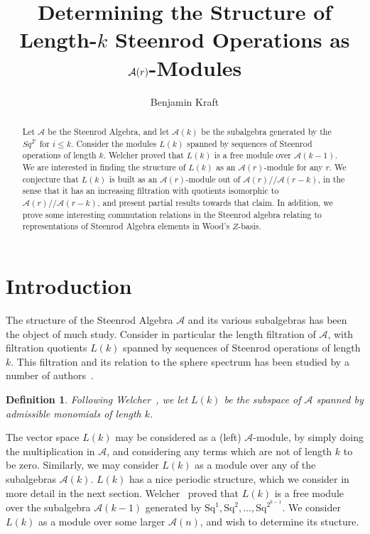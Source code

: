 \documentclass{article}
\title{Determining the Structure of Length-$k$ Steenrod Operations as $\A(r)$-Modules}
\author{Benjamin Kraft}
\date{}
\newcommand{\A}{\mathcal{A}}
\newcommand{\Sq}{\mathrm{Sq}}
\newcommand{\mmod}{/\!/\!}
\newtheorem{defn}{Definition}
\begin{document}
\maketitle

\begin{abstract}
  Let $\A$ be the Steenrod Algebra, and let $\A(k)$ be the subalgebra generated by the $Sq^{2^i}$ for $i\leq k$.  Consider the modules $L(k)$ spanned by sequences of Steenrod operations of length $k$.  Welcher proved that $L(k)$ is a free module over $\A(k-1)$.  We are interested in finding the structure of $L(k)$ as an $\A(r)$-module for any $r$.  We conjecture that $L(k)$ is built as an $\A(r)$-module out of $\A(r)\mmod\A(r-k)$, in the sense that it has an increasing filtration with quotients isomorphic to $\A(r)\mmod\A(r-k)$, and present partial results towards that claim.  In addition, we prove some interesting commutation relations in the Steenrod algebra relating to representations of Steenrod Algebra elements in Wood's $Z$-basis.
\end{abstract}

\section{Introduction}

The structure of the Steenrod Algebra $\A$ and its various subalgebras has been the object of much study.  Consider in particular the length filtration of $\A$, with filtration quotients $L(k)$ spanned by sequences of Steenrod operations of length $k$.  This filtration and its relation to the sphere spectrum has been studied by a number of authors~\cite{nakaoka,welcher,welcher2}.

\begin{defn}
  Following Welcher~\cite{welcher}, we let $L(k)$ be the subspace of $\A$ spanned by admissible monomials of length $k$.
\end{defn}

The vector space $L(k)$ may be considered as a (left) $\A$-module, by simply doing the multiplication in $\A$, and considering any terms which are not of length $k$ to be zero.  Similarly, we may consider $L(k)$ as a module over any of the subalgebras $\A(k)$.  $L(k)$ has a nice periodic structure, which we consider in more detail in the next section.  Welcher~\cite{welcher} proved that $L(k)$ is a free module over the subalgebra $\A(k-1)$ generated by $\Sq^1, \Sq^2, \ldots, \Sq^{2^{k-1}}$.  We consider $L(k)$ as a module over some larger $\A(n)$, and wish to determine its stucture.
\end{document}
